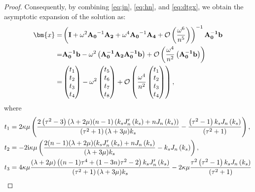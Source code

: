 \documentclass[11pt,reqno,twoside]{amsart}
\theoremstyle{definition}
\theoremstyle{remark}
\numberwithin{equation}{section}
\begin{document}
\begin{proof}
	
	Consequently, by combining \eqref{eq:jn}, \eqref{eq:hn}, and \eqref{eq:dtgx}, we obtain the asymptotic expansion of the solution as:
	\begin{align}
		\bm{x}=&\left(\mathbf{I}+\omega^2\mathbf{A_0}^{-1}\mathbf{A_2}+\omega^4\mathbf{A_0}^{-1}\mathbf{A_4}+\mathcal{O}\left(\frac{\omega^6}{n^5}\right)\right)^{-1}\mathbf{A_{0}^{-1}b}\notag \\
		=& \mathbf{A_0^{-1}b}-\omega^2\left(\mathbf{A_0^{-1}A_2 A_0^{-1}b}\right)+\mathcal{O}\left(\frac{\omega^4}{n^2}\left(\mathbf{A_0^{-1}b}\right)\right) \notag\\
		=&\begin{pmatrix}t_{1} 
			\\t_{2} 
			\\t_{3} 
			\\t_{4} 	
		\end{pmatrix} -\omega^2\begin{pmatrix}t_{5}
			\\t_{6}
			\\t_{7}
			\\t_{8}		
		\end{pmatrix}+\mathcal{O}\left(\frac{\omega^{4}}{n^2}\begin{pmatrix}t_{1} 
			\\t_{2} 
			\\t_{3} 
			\\t_{4} 
		\end{pmatrix}\right),\notag
	\end{align}
	where
	\begin{align}
		t_{1}&=2 \kappa \mu  \left(\frac{ 2\left(\tau ^2-3\right) (\lambda +2 \mu )(n-1)\left(  k_s J_n'\left(k_s\right)+ n J_n\left(k_s\right)\right) }{\left(\tau ^2+1\right) (\lambda +3 \mu ) k_s} -\frac{ \left(\tau ^2-1\right)  k_s J_n\left(k_s\right)}{\left(\tau ^2+1\right)}\right),\notag\\
		t_{2}&=-2 \mathrm{i} \kappa\mu  \left(\frac{ 2 (n-1) (\lambda +2 \mu ) (k_s J_n'\left(k_s\right)+nJ_n\left(k_s\right)}{(\lambda +3 \mu ) k_s}- k_s J_n\left(k_s\right)\right),\notag\\
		t_{3}&=4 \kappa\mu  \frac{  (\lambda +2 \mu )  \left((n-1) \tau ^4+(1-3 n) \tau ^2-2\right) k_sJ_n'\left(k_s\right)}{\left(\tau ^2+1\right) (\lambda +3 \mu ) k_s}-2 \kappa\mu  \frac{ \tau ^2 \left(\tau ^2-1\right)  k_s J_n\left(k_s\right)}{\left(\tau ^2+1\right) }\notag\\

\end{align}
\end{proof}
\end{document}
